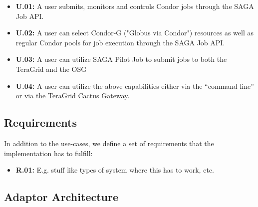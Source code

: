 \begin{itemize}
\item \textbf{U.01:} A user submits, monitors and controls Condor jobs through
the SAGA Job API.

\item \textbf{U.02:} A user can select Condor-G ("Globus via Condor") resources
as well as regular Condor pools for job execution through the SAGA Job API.

\item \textbf{U.03:} A user can utilize SAGA Pilot Job to submit jobs to 
both the TeraGrid and the OSG

\item \textbf{U.04:} A user can utilize the above capabilities either via
the ``command line'' or via the TeraGrid Cactus Gateway. 




\end{itemize}

\subsection{Requirements}

In addition to the use-cases, we define a set of requirements that the 
implementation has to fulfill:

\begin{itemize}
\item \textbf{R.01:} E.g. stuff like types of system where this has to work, etc.
\end{itemize}

\subsection{Adaptor Architecture}

